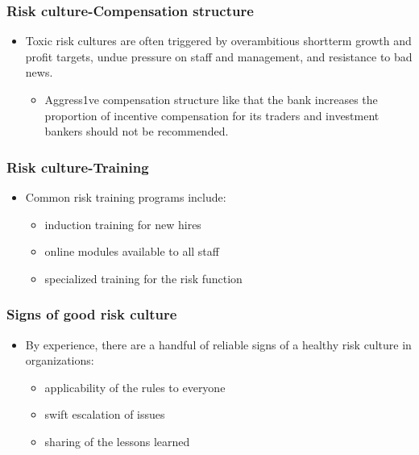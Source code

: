 \subsubsection{Risk culture-Compensation structure}
\begin{itemize}
\item Toxic risk cultures are often triggered by overambitious shortterm growth and profit targets, undue pressure on staff and management, and resistance to bad news.
    \begin{itemize}
    \item Aggress1ve compensation structure like that the bank increases the proportion of incentive compensation for its traders and investment bankers should not be recommended.
    \end{itemize}
\end{itemize}



\subsubsection{Risk culture-Training}
\begin{itemize}
\item Common risk training programs include:
    \begin{itemize}
    \item induction training for new hires
    \item  online modules available to all staff
    \item  specialized training for the risk function
    \end{itemize}
\end{itemize}





\subsubsection{Signs of good risk culture}
\begin{itemize}
\item By experience, there are a handful of reliable signs of a healthy risk culture in organizations:
    \begin{itemize}
    \item  applicability of the rules to everyone
    \item  swift escalation of issues
    \item  sharing of the lessons learned
    \end{itemize}
\end{itemize}





